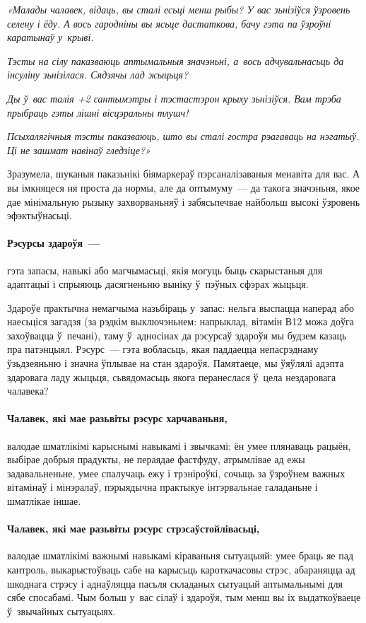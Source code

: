 \emph{«Малады чалавек, відаць, вы сталі есьці менш рыбы? У вас зьнізіўся ўзровень селену і ёду. А вось гародніны вы ясьце дастаткова, бачу гэта па ўзроўні каратынаў у~крыві.}

\emph{Тэсты на сілу паказваюць аптымальныя значэньні, а~вось адчувальнасьць да інсуліну зьнізілася. Сядзячы лад жыцьця?}

\emph{Ды ў~вас талія +2 сантымэтры і тэстастэрон крыху зьнізіўся. Вам трэба прыбраць гэты лішні вісцэральны тлушч!}

\emph{Псыхалягічныя тэсты паказваюць, што вы сталі гостра рэагаваць на нэгатыў. Ці не зашмат навінаў гледзіце?»}

Зразумела, шуканыя паказьнікі біямаркераў пэрсаналізаваныя менавіта для вас. А вы імкняцеся ня проста да нормы, але да оптымуму~--- да такога значэньня, якое дае мінімальную рызыку захворваньняў і забясьпечвае найбольш высокі ўзровень эфэктыўнасьці.

\paragraph{Рэсурсы здароўя~---} гэта запасы, навыкі або магчымасьці, якія могуць быць скарыстаныя для адаптацыі і спрыяюць дасягненьню выніку ў~пэўных сфэрах жыцьця.

Здароўе практычна немагчыма назьбіраць у~запас: нельга выспацца наперад або наесьціся загадзя (за рэдкім выключэньнем: напрыклад, вітамін В12 можа доўга захоўвацца ў~печані), таму ў~адносінах да рэсурсаў здароўя мы будзем казаць пра патэнцыял. Рэсурс~--- гэта вобласьць, якая паддаецца непасрэднаму ўзьдзеяньню і значна ўплывае на стан здароўя. Памятаеце, мы ўяўлялі адэпта здаровага ладу жыцьця, сьвядомасьць якога перанеслася ў~цела нездаровага чалавека?

\paragraph{Чалавек, які мае разьвіты рэсурс харчаваньня,} валодае шматлікімі карыснымі навыкамі і звычкамі: ён умее плянаваць рацыён, выбірае добрыя прадукты, не пераядае фастфуду, атрымлівае ад ежы задавальненьне, умее спалучаць ежу і трэніроўкі, сочыць за ўзроўнем важных вітамінаў і мінэралаў, пэрыядычна практыкуе інтэрвальнае галаданьне і шматлікае іншае.

\paragraph{Чалавек, які мае разьвіты рэсурс стрэсаўстойлівасьці,} валодае шматлікімі важнымі навыкамі кіраваньня сытуацыяй: умее браць яе пад кантроль, выкарыстоўваць сабе на карысьць кароткачасовы стрэс, абараняцца ад шкоднага стрэсу і аднаўляцца пасьля складаных сытуацый аптымальнымі для сябе спосабамі. Чым больш у~вас сілаў і здароўя, тым менш вы іх выдаткоўваеце ў~звычайных сытуацыях.

